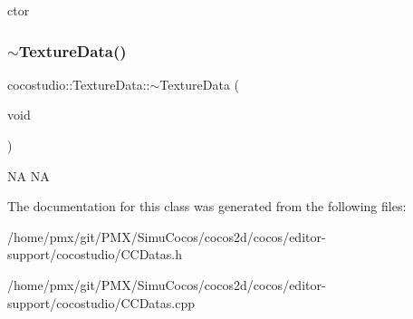 ctor \mbox{\label{classcocostudio_1_1TextureData_a5d9a6888d3afac5e9fcd14b5879647fc}} 
\subsubsection{\texorpdfstring{$\sim$\+Texture\+Data()}{~TextureData()}\hspace{0.1cm}{\footnotesize\ttfamily [2/2]}}
{\footnotesize\ttfamily cocostudio\+::\+Texture\+Data\+::$\sim$\+Texture\+Data (\begin{DoxyParamCaption}\item[{void}]{ }\end{DoxyParamCaption})}

NA  NA 

The documentation for this class was generated from the following files\+:\begin{DoxyCompactItemize}
\item 
/home/pmx/git/\+P\+M\+X/\+Simu\+Cocos/cocos2d/cocos/editor-\/support/cocostudio/C\+C\+Datas.\+h\item 
/home/pmx/git/\+P\+M\+X/\+Simu\+Cocos/cocos2d/cocos/editor-\/support/cocostudio/C\+C\+Datas.\+cpp\end{DoxyCompactItemize}
